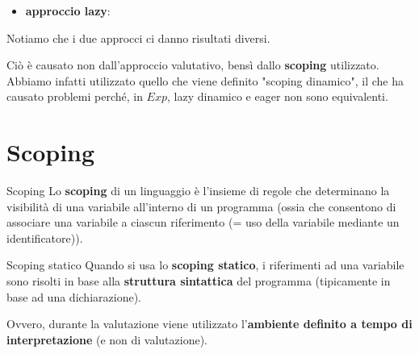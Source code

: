 \documentclass[a4paper,11pt]{report}
\begin{document}
  \begin{itemize}
      \item \textbf{approccio lazy}:
  \end{itemize}
  \vspace{-1em}

\begin{prooftree}
\end{prooftree}

Notiamo che i due approcci ci danno risultati diversi.

Ciò è causato non dall'approccio valutativo, bensì dallo \textbf{scoping} utilizzato. Abbiamo infatti utilizzato quello che viene definito "scoping dinamico", il che ha causato problemi perché, in \( Exp \), lazy dinamico e eager non sono equivalenti.

\pagebreak

\section{Scoping}

\begin{defbox}[colframe=BrightGreen, colback=BrightGreenLight, colbacktitle=BrightGreen]{Scoping}{}
    Lo \textbf{scoping} di un linguaggio è l'insieme di regole che determinano la visibilità di una variabile all'interno di un programma (ossia che consentono di associare una variabile a ciascun riferimento {\small \color{gray} (= uso della variabile mediante un identificatore)}).
\end{defbox}

\begin{defbox}{Scoping statico}{}
    Quando si usa lo \textbf{scoping statico}, i riferimenti ad una variabile sono risolti in base alla \textbf{struttura sintattica} del programma (tipicamente in base ad una dichiarazione).

    Ovvero, durante la valutazione viene utilizzato l'\textbf{ambiente definito a tempo di interpretazione} (e non di valutazione).
\end{defbox}
\end{document}
